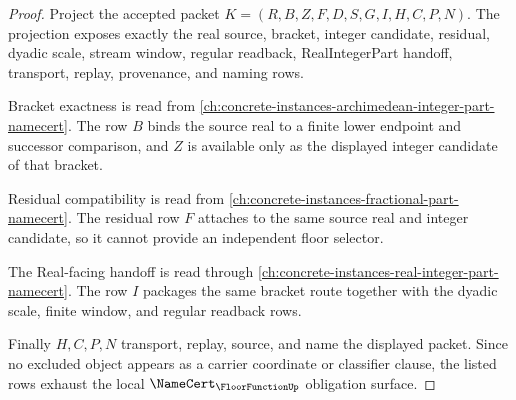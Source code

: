 \begin{proof}
Project the accepted packet $K=(R,B,Z,F,D,S,G,I,H,C,P,N)$. The projection exposes exactly the real source, bracket, integer candidate, residual, dyadic scale, stream window, regular readback, RealIntegerPart handoff, transport, replay, provenance, and naming rows.

Bracket exactness is read from \autoref{ch:concrete-instances-archimedean-integer-part-namecert}. The row $B$ binds the source real to a finite lower endpoint and successor comparison, and $Z$ is available only as the displayed integer candidate of that bracket.

Residual compatibility is read from \autoref{ch:concrete-instances-fractional-part-namecert}. The residual row $F$ attaches to the same source real and integer candidate, so it cannot provide an independent floor selector.

The Real-facing handoff is read through \autoref{ch:concrete-instances-real-integer-part-namecert}. The row $I$ packages the same bracket route together with the dyadic scale, finite window, and regular readback rows.

Finally $H,C,P,N$ transport, replay, source, and name the displayed packet. Since no excluded object appears as a carrier coordinate or classifier clause, the listed rows exhaust the local $\NameCert_{\FloorFunctionUp}$ obligation surface.
\end{proof}


